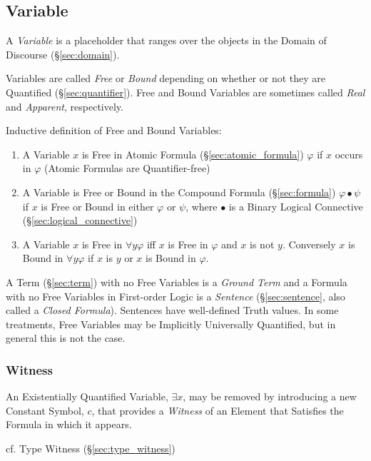 \subsection{Variable}\label{sec:variable}

A \emph{Variable} is a placeholder that ranges over the objects in the
Domain of Discourse (\S\ref{sec:domain}).

Variables are called \emph{Free} or \emph{Bound} depending on whether
or not they are Quantified (\S\ref{sec:quantifier}). Free and Bound
Variables are sometimes called \emph{Real} and \emph{Apparent},
respectively.

Inductive definition of Free and Bound Variables:
\begin{enumerate}
\item A Variable $x$ is Free in Atomic Formula
  (\S\ref{sec:atomic_formula}) $\varphi$ if $x$ occurs in $\varphi$
  (Atomic Formulas are Quantifier-free)
\item A Variable is Free or Bound in the Compound Formula
  (\S\ref{sec:formula}) $\varphi \bullet \psi$ if $x$ is Free or Bound
  in either $\varphi$ or $\psi$, where $\bullet$ is a Binary Logical
  Connective (\S\ref{sec:logical_connective})
\item A Variable $x$ is Free in $\forall y \varphi$ iff $x$ is Free in
  $\varphi$ and $x$ is not $y$. Conversely $x$ is Bound in $\forall y
  \varphi$ if $x$ is $y$ or $x$ is Bound in $\varphi$.
\end{enumerate}

A Term (\S\ref{sec:term}) with no Free Variables is a \emph{Ground
  Term} and a Formula with no Free Variables in First-order Logic is a
\emph{Sentence} (\S\ref{sec:sentence}, also called a \emph{Closed
  Formula}). Sentences have well-defined Truth values. In some
treatments, Free Variables may be Implicitly Universally Quantified,
but in general this is not the case.



\subsubsection{Witness}\label{sec:witness}

An Existentially Quantified Variable, $\exists x$, may be removed by
introducing a new Constant Symbol, $c$, that provides a \emph{Witness}
of an Element that Satisfies the Formula in which it appears.

cf. Type Witness (\S\ref{sec:type_witness})



